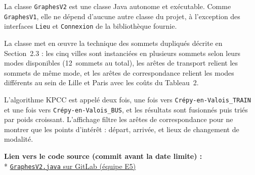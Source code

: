 \documentclass[fontsize=10pt,oneside,parskip=half]{scrreprt}
\newcommand{\ic}[1]{{\setlength{\fboxsep}{2pt}\colorbox{BeigeSerein}{\texttt{#1}}}}
\begin{document}
La classe \ic{GraphesV2} est une classe Java autonome et exécutable. Comme
\ic{GraphesV1}, elle ne dépend d'aucune autre classe du projet, à l'exception des
interfaces \ic{Lieu} et \ic{Connexion} de la bibliothèque fournie.

La classe met en œuvre la technique des sommets dupliqués décrite en Section~2.3 : les
cinq villes sont instanciées en plusieurs sommets selon leurs modes disponibles
(12~sommets au total), les arêtes de transport relient les sommets de même mode, et
les arêtes de correspondance relient les modes différents au sein de Lille et Paris
avec les coûts du Tableau~2.

L'algorithme KPCC est appelé deux fois, une fois vers \ic{Crépy-en-Valois\_TRAIN} et
une fois vers \ic{Crépy-en-Valois\_BUS}, et les résultats sont fusionnés puis triés
par poids croissant. L'affichage filtre les arêtes de correspondance pour ne montrer que
les points d'intérêt : départ, arrivée, et lieux de changement de modalité.

\noindent\textbf{Lien vers le code source (commit avant la date limite) :}\\*
\href{https://gitlab.univ-lille.fr/sae2.01-2.02/2026/E5/-/blob/main/src/main/java/sae/transport/comparison/graphs/GraphesV2.java?ref_type=heads}{\ic{GraphesV2.java} sur GitLab (équipe E5)}
\end{document}
